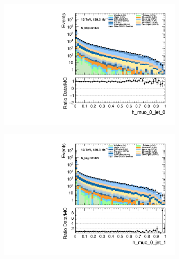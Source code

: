 \begin{figure}
    \centering
    \begin{subfigure}{.49\textwidth}
        \includegraphics[width=\textwidth]{Figures/MC_Data_comp/h_muo_0_jet_0.pdf}
        \caption{}
        \label{fig:et}
    \end{subfigure}
    \hfill
    \begin{subfigure}{.49\textwidth}
        \includegraphics[width=\textwidth]{Figures/MC_Data_comp/h_muo_0_jet_1.pdf}
        \caption{ }
        \label{fig:flcp}
    \end{subfigure}
    \hfill 
    \begin{subfigure}{.49\textwidth}

\end{subfigure}
\end{figure}
